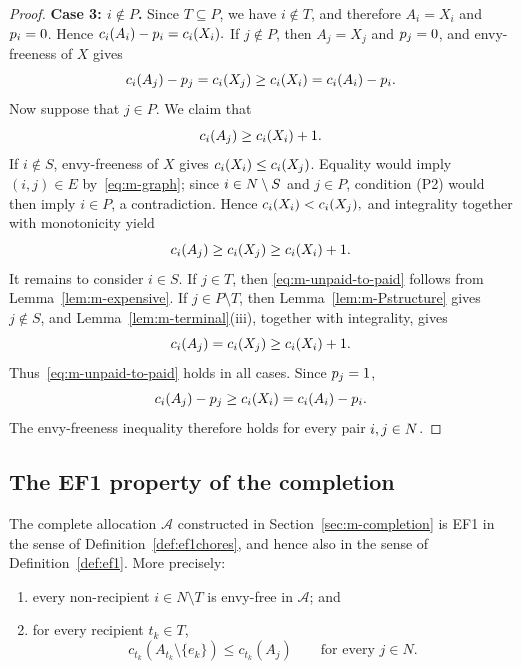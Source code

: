 \begin{proof}
\smallskip
\noindent\textbf{Case 3: $i\notin P$.}
Since $T\subseteq P$, we have $i\notin T$, and therefore
$A_i=X_i$ and $p_i=0$. Hence
\(c_i(A_i)-p_i=c_i(X_i).
\) If $j\notin P$, then $A_j=X_j$ and $p_j=0$, and
envy-freeness of $X$ gives
\[
    c_i(A_j)-p_j
    =c_i(X_j)
    \geq c_i(X_i)=c_i(A_i)-p_i.
\]
Now suppose that $j\in P$. We claim that
\begin{equation}
\label{eq:m-unpaid-to-paid}
    c_i(A_j)\geq c_i(X_i)+1.
\end{equation}
If $i\notin S$, envy-freeness of $X$ gives $c_i(X_i)\leq c_i(X_j)$. Equality would imply $(i,j)\in E$ by~\eqref{eq:m-graph}; since $i\in N\setminus S$ and $j\in P$, condition \textnormal{(P2)} would then imply $i\in P$, a contradiction. Hence \(c_i(X_i)<c_i(X_j), \) and integrality together with monotonicity yield
\[
    c_i(A_j)\geq c_i(X_j)\geq c_i(X_i)+1.
\]
It remains to consider $i\in S$. If $j\in T$, then
\eqref{eq:m-unpaid-to-paid} follows from
Lemma~\ref{lem:m-expensive}. If $j\in P\setminus T$, then
Lemma~\ref{lem:m-Pstructure} gives $j\notin S$, and
Lemma~\ref{lem:m-terminal}(iii), together with integrality, gives
\[
    c_i(A_j)=c_i(X_j)\geq c_i(X_i)+1.
\]
Thus~\eqref{eq:m-unpaid-to-paid} holds in all cases. Since
$p_j=1$,
\[
    c_i(A_j)-p_j
    \geq c_i(X_i)
    =c_i(A_i)-p_i.
\]
The envy-freeness inequality therefore holds for every pair
$i,j\in N$.
\end{proof}

\subsection{The EF1 property of the completion}


\begin{corollary}
\label{cor:ef1}
The complete allocation $\mathcal{A}$ constructed in Section~\ref{sec:m-completion} is EF1 in the sense of Definition~\ref{def:ef1chores}, and hence also in the sense of Definition~\ref{def:ef1}. More precisely:
\begin{enumerate}
    \item [(i)] every non-recipient $i\in N\setminus T$ is envy-free in  $\mathcal{A}$; and
    \item [(ii)] for every recipient $t_k\in T$,
    \[
        c_{t_k}(A_{t_k}\setminus\{e_k\})
        \leq
        c_{t_k}(A_j)
        \qquad\text{for every }j\in N.
    \]
\end{enumerate}
\end{corollary}

